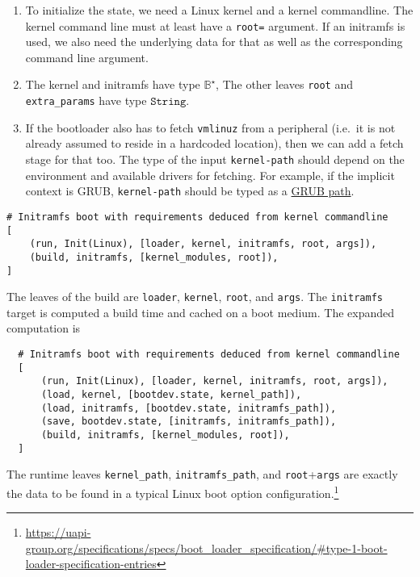 \begin{enumerate}
\def\labelenumi{\arabic{enumi}.}
\tightlist
\item
  To initialize the state, we need a Linux kernel and a kernel commandline. 
  The kernel command line must at least have a \texttt{root=} argument. 
  If an initramfs is used, we also need the underlying data for that as well as the corresponding command line argument. 
\item
  The kernel and initramfs have type \(\mathbb{B}^\star\),
  The other leaves \texttt{root} and \texttt{extra\_params} have type \(\mathtt{String}\).
\item
  If the bootloader also has to fetch \texttt{vmlinuz} from a peripheral
  (i.e.~it is not already assumed to reside in a hardcoded location),
  then we can add a fetch stage for that too. The type of the input
  \texttt{kernel-path} should depend on the environment and available
  drivers for fetching. For example, if the implicit context is GRUB,
  \texttt{kernel-path} should be typed as a
  \href{https://www.gnu.org/software/grub/manual/grub/grub.html\#Naming-convention}{GRUB
  path}.
\end{enumerate}

\begin{verbatim}
# Initramfs boot with requirements deduced from kernel commandline
[
    (run, Init(Linux), [loader, kernel, initramfs, root, args]),
    (build, initramfs, [kernel_modules, root]),
]
\end{verbatim}

The leaves of the build are \texttt{loader}, \texttt{kernel}, \texttt{root}, and \texttt{args}. 
%
The \texttt{initramfs} target is computed a build time and cached on a boot medium.
%
The expanded computation is
\begin{verbatim}
  # Initramfs boot with requirements deduced from kernel commandline
  [
      (run, Init(Linux), [loader, kernel, initramfs, root, args]),
      (load, kernel, [bootdev.state, kernel_path]),
      (load, initramfs, [bootdev.state, initramfs_path]),
      (save, bootdev.state, [initramfs, initramfs_path]),
      (build, initramfs, [kernel_modules, root]),
  ]
\end{verbatim}
The runtime leaves \texttt{kernel\_path}, \texttt{initramfs\_path}, and \texttt{root}+\texttt{args} are exactly the data to be found in a typical Linux boot option configuration.\footnote{\url{https://uapi-group.org/specifications/specs/boot\_loader\_specification/\#type-1-boot-loader-specification-entries}}


